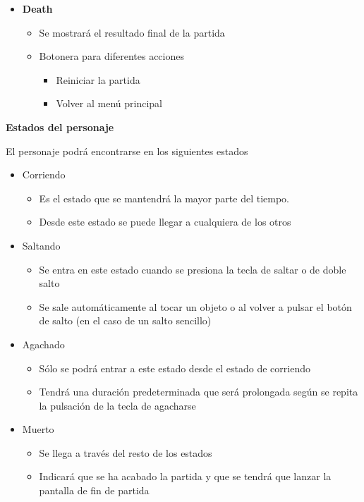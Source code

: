 \documentclass[palatino]{apuntes}
\begin{document}
\begin{itemize}
\begin{itemize}
        \end{itemize}
    \item \textbf{Death}
        \begin{itemize}
            \item Se mostrará el resultado final de la partida
            \item Botonera para diferentes acciones
                \begin{itemize}
                    \item Reiniciar la partida
                    \item Volver al menú principal
                \end{itemize}
        \end{itemize}
\end{itemize}



\textbf{Estados del personaje}

El personaje podrá encontrarse en los siguientes estados

\begin{itemize}
    \item Corriendo
    \begin{itemize}
        \item Es el estado que se mantendrá la mayor parte del tiempo. 
        \item Desde este estado se puede llegar a cualquiera de los otros
    \end{itemize}
    \item Saltando
    \begin{itemize}
        \item Se entra en este estado cuando se presiona la tecla de saltar o de doble salto
        \item Se sale automáticamente al tocar un objeto o al volver a pulsar el botón de salto (en el caso de un salto sencillo)
    \end{itemize}
    \item Agachado
    \begin{itemize}
        \item Sólo se podrá entrar a este estado desde el estado de corriendo
        \item Tendrá una duración predeterminada que será prolongada según se repita la pulsación de la tecla de agacharse
    \end{itemize}
    \item Muerto
    \begin{itemize}
        \item Se llega a través del resto de los estados
        \item Indicará que se ha acabado la partida y que se tendrá que lanzar la pantalla de fin de partida
    \end{itemize}
\end{itemize}
\end{document}
